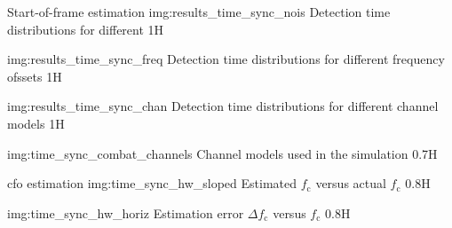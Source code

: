 
\begin{subchapter}{Start-of-frame estimation}
               {img:results_time_sync_nois}
               {Detection time distributions for different }
               {1}{H}

               {img:results_time_sync_freq}
               {Detection time distributions for different frequency ofssets}
               {1}{H}

               {img:results_time_sync_chan}
               {Detection time distributions for different channel models}
               {1}{H}

               {img:time_sync_combat_channels}
               {Channel models used in the simulation}
               {0.7}{H}

\end{subchapter}

\begin{subchapter}{\Acrlong{cfo} estimation}
                  {img:time_sync_hw_sloped}
                  {Estimated $f_\text{c}$ versus actual $f_\text{c}$}
                  {0.8}{H}

                  {img:time_sync_hw_horiz}
                  {Estimation error $\Delta f_\text{c}$ versus $f_\text{c}$}
                  {0.8}{H}
\end{subchapter}

